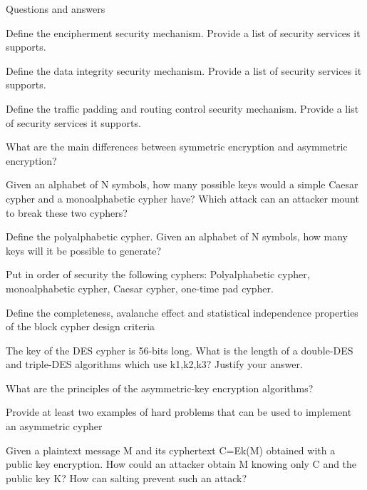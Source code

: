 \begin{section}{Questions and answers}
  \begin{subsubsection}{Define the encipherment security mechanism. Provide a list of security
    services it supports.}
  \end{subsubsection}
  \begin{subsubsection}{Define the data integrity security mechanism. Provide a list of security
    services it supports.}
  \end{subsubsection}
  \begin{subsubsection}{Define the traffic padding and routing control security mechanism. Provide a
    list of security services it supports.}
  \end{subsubsection}
  \begin{subsubsection}{What are the main differences between symmetric encryption and asymmetric
    encryption?}
  \end{subsubsection}
  \begin{subsubsection}{Given an alphabet of N symbols, how many possible keys would a simple Caesar
      cypher and a monoalphabetic cypher have? Which attack can an attacker mount to break these two
    cyphers?}
  \end{subsubsection}
  \begin{subsubsection}{Define the polyalphabetic cypher. Given an alphabet of N symbols, how many
    keys will it be possible to generate?}
  \end{subsubsection}
  \begin{subsubsection}{Put in order of security the following cyphers: Polyalphabetic cypher,
    monoalphabetic cypher, Caesar cypher, one-time pad cypher. }
  \end{subsubsection}
  \begin{subsubsection}{Define the completeness, avalanche effect and statistical independence
    properties of the block cypher design criteria}
  \end{subsubsection}
  \begin{subsubsection}{The key of the DES cypher is 56-bits long. What is the length of a
    double-DES and triple-DES algorithms which use k1,k2,k3? Justify your answer.}
  \end{subsubsection}
  \begin{subsubsection}{What are the principles of the asymmetric-key encryption algorithms?}
  \end{subsubsection}
  \begin{subsubsection}{Provide at least two examples of hard problems that can be used to implement
    an asymmetric cypher}
  \end{subsubsection}
  \begin{subsubsection}{Given a plaintext message M and its cyphertext C=Ek(M) obtained with a
      public key encryption. How could an attacker obtain M knowing only C and the public key K? How
    can salting prevent such an attack?}
  \end{subsubsection}
\end{section}
